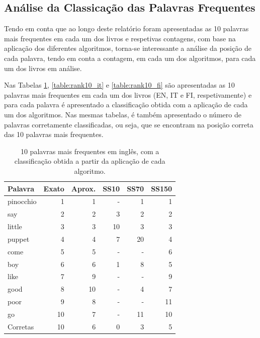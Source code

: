 \documentclass[mirror, portugues]{revdetua}
\begin{document}
\subsection{Análise da Classicação das Palavras Frequentes}

Tendo em conta que ao longo deste relatório foram apresentadas as 10 palavras mais frequentes em cada um dos livros e respetivas contagens, com base na aplicação dos diferentes algoritmos, torna-se interessante a análise da posição de cada palavra, tendo em conta a contagem, em cada um dos algoritmos, para cada um dos livros em análise.

Nas Tabelas \ref{table:rank10_ing}, \ref{table:rank10_it} e \ref{table:rank10_fi} são apresentadas as 10 palavras mais frequentes em cada um dos livros (EN, IT e FI, respetivamente) e para cada palavra é apresentado a classificação obtida com a aplicação de cada um dos algoritmos. Nas mesmas tabelas, é também apresentado o número de palavras corretamente classificadas, ou seja, que se encontram na posição correta das 10 palavras mais frequentes.

\begin{table}[H]
\centering
\caption{10 palavras mais frequentes em inglês, com a classificação obtida a partir da aplicação de cada algoritmo.}
\label{table:rank10_ing}
\begin{tabular}{lrrrrr}
\toprule
Palavra & Exato & Aprox. & SS10 & SS70 & SS150 \\
\midrule
pinocchio & 1 & 1 & - & 1 & 1 \\
say & 2 & 2 & 3 & 2 & 2 \\
little & 3 & 3 & 10 & 3 & 3 \\
puppet & 4 & 4 & 7 & 20 & 4 \\
come & 5 & 5 & - & - & 6 \\
boy & 6 & 6 & 1 & 8 & 5 \\
like & 7 & 9 & - & - & 9 \\
good & 8 & 10 & - & 4 & 7 \\
poor & 9 & 8 & - & - & 11 \\
go & 10 & 7 & - & 11 & 10 \\
\midrule
Corretas & 10 & 6 & 0 & 3 & 5 \\
\bottomrule
\end{tabular}
\end{table}
\end{document}
